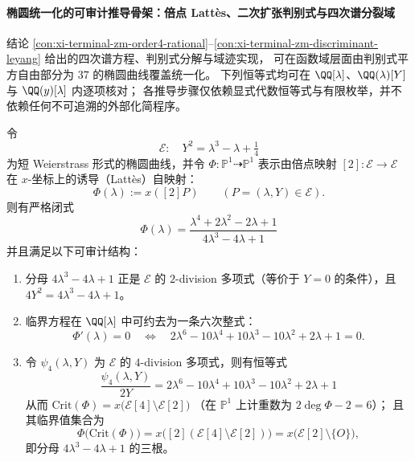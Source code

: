 \paragraph{椭圆统一化的可审计推导骨架：倍点 Latt\`es、二次扩张判别式与四次谱分裂域}
结论 \ref{con:xi-terminal-zm-order4-rational}--\ref{con:xi-terminal-zm-discriminant-leyang} 给出的四次谱方程、判别式分解与域迹实现，
可在函数域层面由判别式平方自由部分为 \(37\) 的椭圆曲线覆盖统一化。
下列恒等式均可在 \(\QQ[\lambda]\)、\(\QQ(\lambda)[Y]\) 与 \(\QQ(y)[\lambda]\) 内逐项核对；
各推导步骤仅依赖显式代数恒等式与有限枚举，并不依赖任何不可追溯的外部化简程序。

\begin{conclusion}\label{con:xi-terminal-zm-lattes-4division-certificate}
令
\[
\mathcal{E}:\quad Y^{2}=\lambda^{3}-\lambda+\tfrac14
\]
为短 Weierstrass 形式的椭圆曲线，并令 \(\Phi:\mathbb{P}^{1}\dashrightarrow\mathbb{P}^{1}\) 表示由倍点映射 \([2]:\mathcal{E}\to\mathcal{E}\) 在 \(x\)-坐标上的诱导（Latt\`es）自映射：
\[
\Phi(\lambda):=x([2]P)\qquad(P=(\lambda,Y)\in\mathcal{E}).
\]
则有严格闭式
\[
\boxed{\;
\Phi(\lambda)=\frac{\lambda^{4}+2\lambda^{2}-2\lambda+1}{4\lambda^{3}-4\lambda+1}\;}
\]
并且满足以下可审计结构：
\begin{enumerate}
  \item 分母 \(4\lambda^{3}-4\lambda+1\) 正是 \(\mathcal{E}\) 的 \(2\)-division 多项式（等价于 \(Y=0\) 的条件），且
  \(
  4Y^{2}=4\lambda^{3}-4\lambda+1
  \)。
  \item 临界方程在 \(\QQ[\lambda]\) 中可约去为一条六次整式：
  \[
  \Phi'(\lambda)=0\quad\Longleftrightarrow\quad
  2\lambda^{6}-10\lambda^{4}+10\lambda^{3}-10\lambda^{2}+2\lambda+1=0.
  \]
  \item 令 \(\psi_{4}(\lambda,Y)\) 为 \(\mathcal{E}\) 的 \(4\)-division 多项式，则有恒等式
  \[
  \boxed{\;
  \frac{\psi_{4}(\lambda,Y)}{2Y}
  =2\lambda^{6}-10\lambda^{4}+10\lambda^{3}-10\lambda^{2}+2\lambda+1\;}
  \]
  从而
  \(
  \mathrm{Crit}(\Phi)=x\bigl(\mathcal{E}[4]\setminus\mathcal{E}[2]\bigr)
  \)
  （在 \(\mathbb{P}^{1}\) 上计重数为 \(2\deg\Phi-2=6\)）；
  且其临界值集合为
  \[
  \Phi\!\bigl(\mathrm{Crit}(\Phi)\bigr)
  =x\bigl([2](\mathcal{E}[4]\setminus\mathcal{E}[2])\bigr)
  =x\bigl(\mathcal{E}[2]\setminus\{O\}\bigr),
  \]
  即分母 \(4\lambda^{3}-4\lambda+1\) 的三根。
\end{enumerate}
\end{conclusion}

